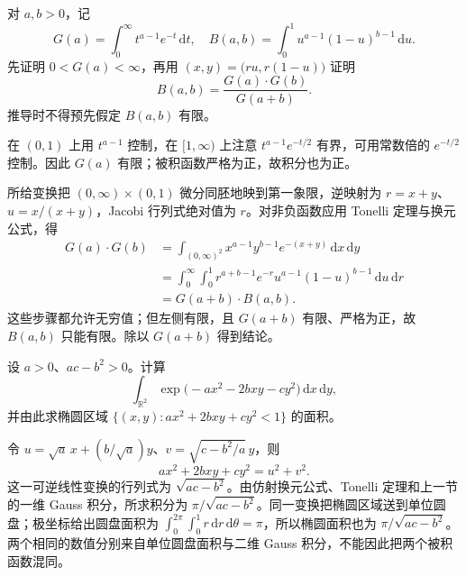 \begin{exercise}\label{b1:ex:07-euler-integrals}
对 \(a,b>0\)，记
\[
G(a)=\int_0^\infty t^{a-1}e^{-t}\,\mathrm{d}t,\quad
B(a,b)=\int_0^1u^{a-1}(1-u)^{b-1}\,\mathrm{d}u.
\]
先证明 \(0<G(a)<\infty\)，再用 \((x,y)=\bigl(ru,r(1-u)\bigr)\) 证明
\[
B(a,b)=\frac{G(a)\cdot G(b)}{G(a+b)}.
\]
推导时不得预先假定 \(B(a,b)\) 有限。
\end{exercise}
\begin{solution}
在 \((0,1)\) 上用 \(t^{a-1}\) 控制，在 \([1,\infty)\) 上注意
\(t^{a-1}e^{-t/2}\) 有界，可用常数倍的 \(e^{-t/2}\) 控制。因此 \(G(a)\) 有限；被积函数严格为正，故积分也为正。

所给变换把 \((0,\infty)\times(0,1)\) 微分同胚地映到第一象限，逆映射为 \(r=x+y\)、\(u=x/(x+y)\)，Jacobi 行列式绝对值为 \(r\)。对非负函数应用 Tonelli 定理与换元公式，得
\begin{align*}
G(a)\cdot G(b)
&=\int_{(0,\infty)^2}x^{a-1}y^{b-1}e^{-(x+y)}\,\mathrm{d}x\,\mathrm{d}y\\
&=\int_0^\infty\int_0^1
r^{a+b-1}e^{-r}u^{a-1}(1-u)^{b-1}\,\mathrm{d}u\,\mathrm{d}r\\
&=G(a+b)\cdot B(a,b).
\end{align*}
这些步骤都允许无穷值；但左侧有限，且 \(G(a+b)\) 有限、严格为正，故 \(B(a,b)\) 只能有限。除以 \(G(a+b)\) 得到结论。
\end{solution}

\begin{exercise}\label{b1:ex:07-gaussian-quadratic}
设 \(a>0\)、\(ac-b^2>0\)。计算
\[
\int_{\mathbb R^2}\exp\bigl(-ax^2-2bxy-cy^2\bigr)\,\mathrm{d}x\,\mathrm{d}y,
\]
并由此求椭圆区域
\(\{(x,y):ax^2+2bxy+cy^2<1\}\) 的面积。
\end{exercise}
\begin{solution}
令 \(u=\sqrt a\,x+(b/\sqrt a)y\)、\(v=\sqrt{c-b^2/a}\,y\)，则
\[
ax^2+2bxy+cy^2=u^2+v^2.
\]
这一可逆线性变换的行列式为 \(\sqrt{ac-b^2}\)。由仿射换元公式、Tonelli 定理和上一节的一维 Gauss 积分，所求积分为
\(\pi/\sqrt{ac-b^2}\)。同一变换把椭圆区域送到单位圆盘；极坐标给出圆盘面积为
\(\int_0^{2\pi}\int_0^1r\,\mathrm{d}r\,\mathrm{d}\theta=\pi\)，所以椭圆面积也为
\(\pi/\sqrt{ac-b^2}\)。两个相同的数值分别来自单位圆盘面积与二维 Gauss 积分，不能因此把两个被积函数混同。
\end{solution}

